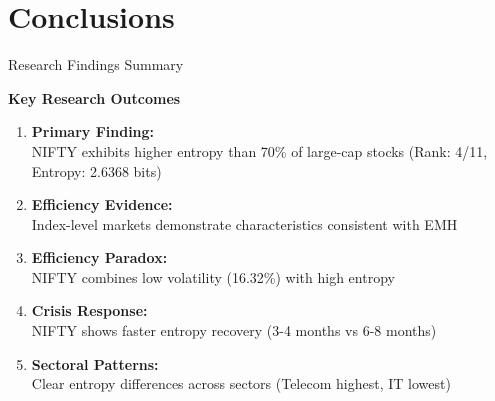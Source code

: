 \documentclass[aspectratio=169,12pt,xcolor=table]{beamer}
\begin{document}
\section{Conclusions}

\begin{frame}{Research Findings Summary}
\begin{center}
\Large \textbf{Key Research Outcomes}
\end{center}

\vspace{0.1cm}
\begin{enumerate}
    \item \textcolor{niftyblue}{\textbf{Primary Finding:}} \\
    NIFTY exhibits higher entropy than 70\% of large-cap stocks (Rank: 4/11, Entropy: 2.6368 bits)
    
    \vspace{0.1cm}
    \item \textcolor{niftygreen}{\textbf{Efficiency Evidence:}} \\
    Index-level markets demonstrate characteristics consistent with EMH
    
    \vspace{0.1cm}
    \item \textcolor{niftyorange}{\textbf{Efficiency Paradox:}} \\
    NIFTY combines low volatility (16.32\%) with high entropy
    
    \vspace{0.1cm}
    \item \textcolor{niftyred}{\textbf{Crisis Response:}} \\
    NIFTY shows faster entropy recovery (3-4 months vs 6-8 months)
    
    \vspace{0.1cm}
    \item \textcolor{niftyblue}{\textbf{Sectoral Patterns:}} \\
    Clear entropy differences across sectors (Telecom highest, IT lowest)
\end{enumerate}
\end{frame}
\end{document}
